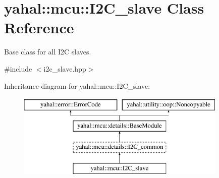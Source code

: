 \hypertarget{classyahal_1_1mcu_1_1_i2_c__slave}{}\section{yahal\+:\+:mcu\+:\+:I2\+C\+\_\+slave Class Reference}
\label{classyahal_1_1mcu_1_1_i2_c__slave}


Base class for all I2\+C slaves.  




{\ttfamily \#include $<$i2c\+\_\+slave.\+hpp$>$}

Inheritance diagram for yahal\+:\+:mcu\+:\+:I2\+C\+\_\+slave\+:\begin{figure}[H]
\begin{center}
\leavevmode
\includegraphics[height=4.000000cm]{classyahal_1_1mcu_1_1_i2_c__slave}
\end{center}
\end{figure}
